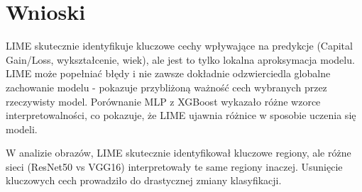 \documentclass[12pt,a4paper]{article}
\begin{document}
\section{Wnioski}

LIME skutecznie identyfikuje kluczowe cechy wpływające na predykcje (Capital Gain/Loss, wykształcenie, wiek), ale jest to tylko lokalna aproksymacja modelu. LIME może popełniać błędy i nie zawsze dokładnie odzwierciedla globalne zachowanie modelu - pokazuje przybliżoną ważność cech wybranych przez rzeczywisty model. Porównanie MLP z XGBoost wykazało różne wzorce interpretowalności, co pokazuje, że LIME ujawnia różnice w sposobie uczenia się modeli.

W analizie obrazów, LIME skutecznie identyfikował kluczowe regiony, ale różne sieci (ResNet50 vs VGG16) interpretowały te same regiony inaczej. Usunięcie kluczowych cech prowadziło do drastycznej zmiany klasyfikacji.
\end{document}

